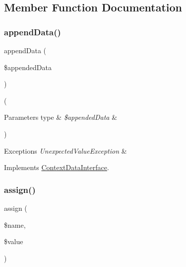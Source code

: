 \subsection{Member Function Documentation}
\mbox{\label{class_pes_1_1_type_1_1_context_data_a9ca70df7ea476fc99e323dd024495ddc}} 
\subsubsection{\texorpdfstring{append\+Data()}{appendData()}}
{\footnotesize\ttfamily append\+Data (\begin{DoxyParamCaption}\item[{}]{\$appended\+Data }\end{DoxyParamCaption})}

(
\begin{DoxyParams}[1]{Parameters}
type & {\em \$appended\+Data} & \\
\hline
\end{DoxyParams}
) 
\begin{DoxyExceptions}{Exceptions}
{\em Unexpected\+Value\+Exception} & \\
\hline
\end{DoxyExceptions}


Implements \mbox{\hyperlink{interface_pes_1_1_type_1_1_context_data_interface_a9ca70df7ea476fc99e323dd024495ddc}{Context\+Data\+Interface}}.

\mbox{\label{class_pes_1_1_type_1_1_context_data_ac151b5fc880911b525ed71fd25806f62}} 
\subsubsection{\texorpdfstring{assign()}{assign()}}
{\footnotesize\ttfamily assign (\begin{DoxyParamCaption}\item[{}]{\$name,  }\item[{}]{\$value }\end{DoxyParamCaption})}


